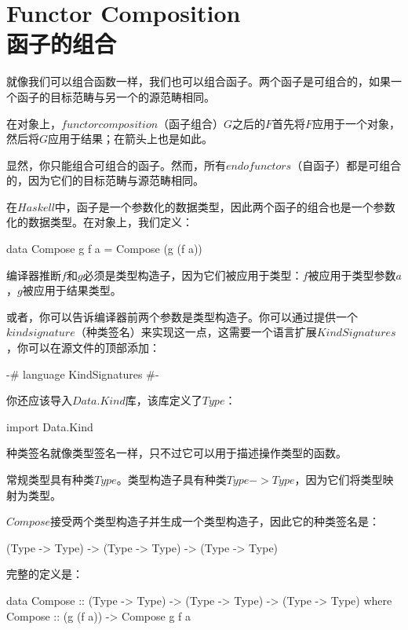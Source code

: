 \documentclass[DaoFP]{subfiles}
\begin{document}
    \section{Functor Composition\\函子的组合}

    就像我们可以组合函数一样，我们也可以组合函子。两个函子是可组合的，如果一个函子的目标范畴与另一个的源范畴相同。

    在对象上，$functor composition$（函子组合）$G$之后的$F$首先将$F$应用于一个对象，然后将$G$应用于结果；在箭头上也是如此。

    显然，你只能组合可组合的函子。然而，所有$endofunctors$（自函子）都是可组合的，因为它们的目标范畴与源范畴相同。

    在$Haskell$中，函子是一个参数化的数据类型，因此两个函子的组合也是一个参数化的数据类型。在对象上，我们定义：

    \begin{haskell}
        data Compose g f a = Compose (g (f a))
    \end{haskell}

    编译器推断$f$和$g$必须是类型构造子，因为它们被应用于类型：$f$被应用于类型参数$a$，$g$被应用于结果类型。

    或者，你可以告诉编译器前两个参数是类型构造子。你可以通过提供一个$kind signature$（种类签名）来实现这一点，这需要一个语言扩展$KindSignatures$，你可以在源文件的顶部添加：

    \begin{haskell}
    {-# language KindSignatures #-}
    \end{haskell}

    你还应该导入$Data.Kind$库，该库定义了$Type$：

    \begin{haskell}
        import Data.Kind
    \end{haskell}

    种类签名就像类型签名一样，只不过它可以用于描述操作类型的函数。

    常规类型具有种类$Type$。类型构造子具有种类$Type -> Type$，因为它们将类型映射为类型。

    $Compose$接受两个类型构造子并生成一个类型构造子，因此它的种类签名是：

    \begin{haskell}
    (Type -> Type) -> (Type -> Type) -> (Type -> Type)
    \end{haskell}

    完整的定义是：

    \begin{haskell}
        data Compose :: (Type -> Type) -> (Type -> Type) -> (Type -> Type)
        where
        Compose :: (g (f a)) -> Compose g f a
    \end{haskell}
\end{document}
